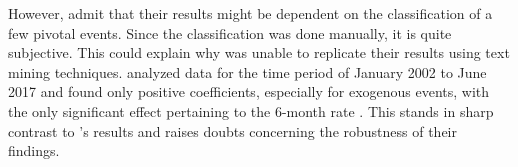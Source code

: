 \documentclass[11pt,a4paper,english,oneside]{book}
\numberwithin{equation}{chapter}
\begin{document}
However, \citet[~p. 20]{Ellingsen.2003} admit that their results might be dependent on the classification of a few pivotal events. Since the classification was done manually, it is quite subjective. This could explain why \cite{Krosigk.2017} was unable to replicate their results using text mining techniques.  analyzed data for the time period of January 2002 to June 2017 and found only positive coefficients, especially for exogenous events, with the only significant effect pertaining to the 6-month rate \citeyearpar[~p. 36]{Krosigk.2017}. This stands in sharp contrast to \citeauthor{Ellingsen.2003}'s results and raises doubts concerning the robustness of their findings.

%	
%
\end{document}
